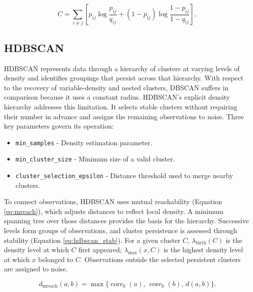 \begin{equation}\label{eq:umap_ce}
C=\sum_{i\ne j}\left[p_{ij}\log\frac{p_{ij}}{q_{ij}}+(1-p_{ij})\log\frac{1-p_{ij}}{1-q_{ij}}\right],
\end{equation}

\subsection{HDBSCAN}
HDBSCAN represents data through a hierarchy of clusters at varying levels of density and identifies groupings that persist across that hierarchy. With respect to the recovery of variable-density and nested clusters, DBSCAN suffers in comparison because it uses a constant radius. HDBSCAN's explicit density hierarchy addresses this limitation. It selects stable clusters without requiring their number in advance and assigns the remaining observations to noise. Three key parameters govern its operation:

\begin{itemize}

    \item \texttt{min\_samples} - Density estimation parameter.

    \item \texttt{min\_cluster\_size} - Minimum size of a valid cluster.

    \item \texttt{cluster\_selection\_epsilon} - Distance threshold used to merge nearby clusters.

\end{itemize}

To connect observations, HDBSCAN uses mutual reachability (Equation \ref{eq:mreach}), which adjusts distances to reflect local density. A minimum spanning tree over those distances provides the basis for the hierarchy. Successive levels form groups of observations, and cluster persistence is assessed through stability (Equation \ref{eq:hdbscan_stab}). For a given cluster \(C\), \(\lambda_{\mathrm{birth}}(C)\) is the density level at which \(C\) first appeared; \(\lambda_{\max}(x,C)\) is the highest density level at which \(x\) belonged to \(C\). Observations outside the selected persistent clusters are assigned to noise.

\begin{equation}\label{eq:mreach}
d_{\mathrm{mreach}}(a,b)=\max\bigl\{\operatorname{core}_k(a),\,\operatorname{core}_k(b),\,d(a,b)\bigr\}.
\end{equation}

